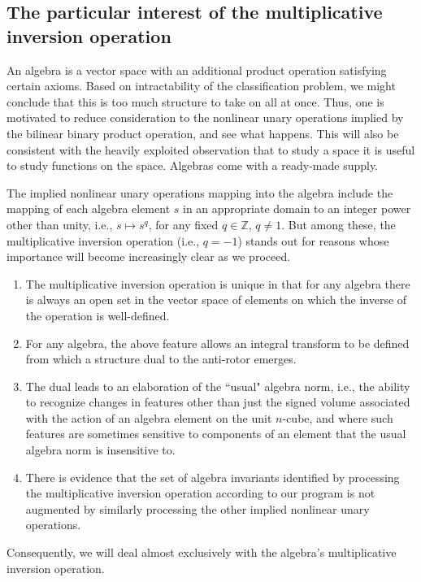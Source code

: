 \documentclass{amsart}
\numberwithin{equation}{section}
\theoremstyle{definition}
\numberwithin{theorem}{section}
\begin{document}
 \subsection{The particular interest of the multiplicative inversion operation} An algebra is a vector space with an additional product operation satisfying certain axioms.  Based on intractability of the classification problem, we might conclude that this is too much structure to take on all at once.  Thus, one is motivated to reduce consideration to the nonlinear unary operations implied by the bilinear binary product operation, and see what happens.  This will also be consistent with the heavily exploited observation that to study a space it is useful to study functions on the space.  Algebras come with a ready-made supply.
 
The implied nonlinear unary operations mapping into the algebra include the mapping of each algebra element $s$ in an appropriate domain to an integer power other than unity, i.e., $s\mapsto s^q$, for any fixed $q\in\mathbb{Z}$, $q\ne 1$.  But among these, the multiplicative inversion operation (i.e., $q=-1$)  stands out for reasons whose importance will become increasingly clear as we proceed.   \begin{enumerate}\item The multiplicative inversion operation is unique in that for any algebra there is always an open set in the vector space of elements on which the inverse of the operation is well-defined.   
\item For any algebra, the above feature allows an integral transform to be defined from which a structure dual to the anti-rotor emerges. \item The dual leads to an elaboration of the ``usual" algebra norm, i.e., the ability to recognize changes in features other than just the signed volume associated with the action of an algebra element on the unit $n$-cube, and where such features are sometimes sensitive to components of an element that the usual algebra norm is insensitive to.
\item There is evidence that the set of algebra invariants identified by processing the multiplicative inversion operation according to our program is not augmented by similarly processing the other implied nonlinear unary operations.
\end{enumerate} 

Consequently, we will deal almost exclusively with the algebra's multiplicative inversion operation.
 
\end{document}
